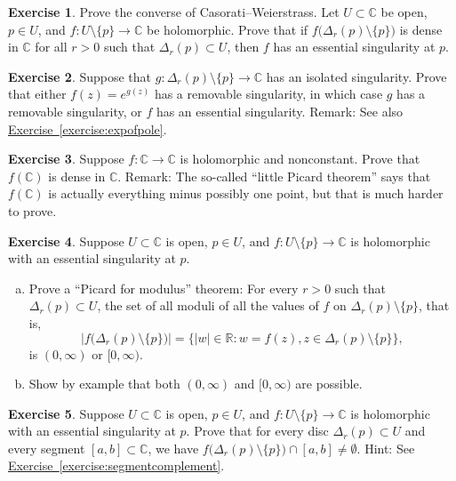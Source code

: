 \documentclass[12pt,openany]{book}
\newcommand{\sabs}[1]{\lvert {#1} \rvert}
\newcommand{\abs}[1]{\left\lvert {#1} \right\rvert}
\newcommand{\C}{{\mathbb{C}}}
\newcommand{\R}{{\mathbb{R}}}
\newcommand{\myquote}[1]{``#1''}
\theoremstyle{plain}
\theoremstyle{remark}
\theoremstyle{definition}
\newenvironment{exbox}{%
    \def\FrameCommand{\vrule width 1pt \relax\hspace{10pt}}%
    \MakeFramed{\advance\hsize-\width\FrameRestore}%
}{%
    \endMakeFramed
}
\newenvironment{exparts}{%
    \leavevmode\begin{enumerate}[a),noitemsep,topsep=0pt,parsep=0pt,partopsep=0pt]
}{%
    \end{enumerate}
}
\theoremstyle{exercise}
\newtheorem{exercise}{Exercise}[section]
\theoremstyle{example}
\newcommand{\exerciseref}[1]{\hyperref[#1]{Exercise~\ref*{#1}}}
\begin{document}
\begin{exbox}
\begin{exercise}
Prove the converse of Casorati--Weierstrass.
Let $U \subset \C$ be open, $p \in U$, and
$f \colon U \setminus \{ p \} \to \C$
be holomorphic.
Prove that if $f\bigl(\Delta_r(p) \setminus \{ p \} \bigr)$ is dense in $\C$
for all $r > 0$ such that $\Delta_r(p) \subset U$,
then $f$ has an essential singularity at $p$.
\end{exercise}

\begin{exercise}%
\label{exercise:singofexp}
Suppose that $g \colon \Delta_r(p) \setminus \{ p \} \to \C$
has an isolated singularity.  Prove that either
$f(z) = e^{g(z)}$ has a removable singularity, in which case $g$
has a removable singularity, or $f$ has an essential singularity.
Remark: See also \exerciseref{exercise:expofpole}.
\end{exercise}

\begin{exercise}
Suppose $f \colon \C \to \C$ is holomorphic and nonconstant.
Prove that $f(\C)$ is dense in $\C$.
Remark: The so-called \myquote{little Picard theorem} says that $f(\C)$
is actually everything minus possibly one point,
but that is much harder to prove.
\end{exercise}

\begin{exercise}
Suppose $U \subset \C$ is open, $p \in U$,
and $f \colon U \setminus \{ p \} \to \C$ is
holomorphic with an essential singularity at $p$.
\begin{exparts}
\item
Prove a \myquote{Picard for modulus} theorem:
For every $r > 0$ such that
$\Delta_r(p) \subset U$, the set
of all moduli of all the values of $f$ on $\Delta_r(p) \setminus \{ p \}$,
that is,
\begin{equation*}
\abs{f\bigl(\Delta_r(p) \setminus \{ p \} \bigr)}
=
\bigl\{ \sabs{w} \in \R : w = f(z), z \in \Delta_r(p) \setminus \{ p \}
\bigr\},
\end{equation*}
is $(0,\infty)$ or $[0,\infty)$.
\item
Show by example that both $(0,\infty)$ and $[0,\infty)$ are possible.
\end{exparts}
\end{exercise}

\begin{exercise}
Suppose $U \subset \C$ is open, $p \in U$, and $f \colon U \setminus \{ p \} \to \C$ is
holomorphic with
an essential singularity at $p$.  Prove that for every disc
$\Delta_r(p) \subset U$ and every segment $[a,b] \subset
\C$, we have
$f\bigl(\Delta_r(p) \setminus \{ p \} \bigr) \cap [a,b] \neq \emptyset$.
Hint: See 
\exerciseref{exercise:segmentcomplement}.
\end{exercise}
\end{exbox}
\end{document}
